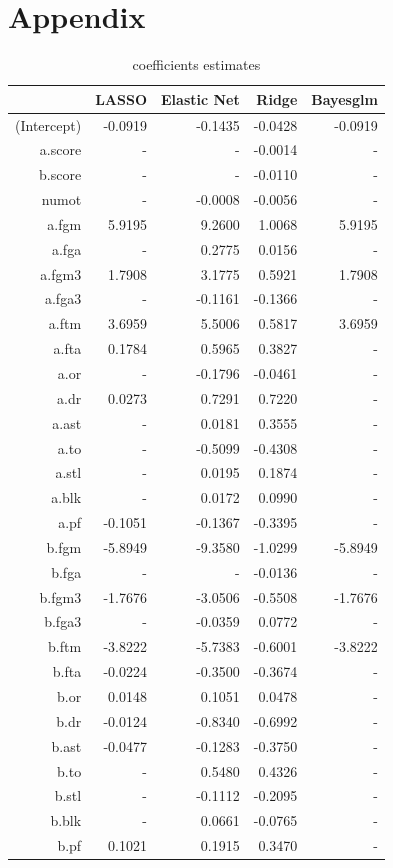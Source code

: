 \documentclass{article} %
\begin{document}
\section{Appendix}
\begin{table}[H]
\centering
{\small
\begin{tabular}{rrrrr}
  \hline
 & LASSO & Elastic Net & Ridge & Bayesglm \\ 
  \hline
(Intercept) & -0.0919 & -0.1435 & -0.0428 & -0.0919 \\ 
  a.score & - & - & -0.0014 & - \\ 
  b.score & - & - & -0.0110 & - \\ 
  numot & - & -0.0008 & -0.0056 & - \\ 
  a.fgm & 5.9195 & 9.2600 & 1.0068 & 5.9195 \\ 
  a.fga & - & 0.2775 & 0.0156 & - \\ 
  a.fgm3 & 1.7908 & 3.1775 & 0.5921 & 1.7908 \\ 
  a.fga3 & - & -0.1161 & -0.1366 & - \\ 
  a.ftm & 3.6959 & 5.5006 & 0.5817 & 3.6959 \\ 
  a.fta & 0.1784 & 0.5965 & 0.3827 & - \\ 
  a.or & - & -0.1796 & -0.0461 & - \\ 
  a.dr & 0.0273 & 0.7291 & 0.7220 & - \\ 
  a.ast & - & 0.0181 & 0.3555 & - \\ 
  a.to & - & -0.5099 & -0.4308 & - \\ 
  a.stl & - & 0.0195 & 0.1874 & - \\ 
  a.blk & - & 0.0172 & 0.0990 & - \\ 
  a.pf & -0.1051 & -0.1367 & -0.3395 & - \\ 
  b.fgm & -5.8949 & -9.3580 & -1.0299 & -5.8949 \\ 
  b.fga & - & - & -0.0136 & - \\ 
  b.fgm3 & -1.7676 & -3.0506 & -0.5508 & -1.7676 \\ 
  b.fga3 & - & -0.0359 & 0.0772 & - \\ 
  b.ftm & -3.8222 & -5.7383 & -0.6001 & -3.8222 \\ 
  b.fta & -0.0224 & -0.3500 & -0.3674 & - \\ 
  b.or & 0.0148 & 0.1051 & 0.0478 & - \\ 
  b.dr & -0.0124 & -0.8340 & -0.6992 & - \\ 
  b.ast & -0.0477 & -0.1283 & -0.3750 & - \\ 
  b.to & - & 0.5480 & 0.4326 & - \\ 
  b.stl & - & -0.1112 & -0.2095 & - \\ 
  b.blk & - & 0.0661 & -0.0765 & - \\ 
  b.pf & 0.1021 & 0.1915 & 0.3470 & - \\ 
   \hline
\end{tabular}
}
\caption{coefficients estimates}\
\end{table}
\end{document}
